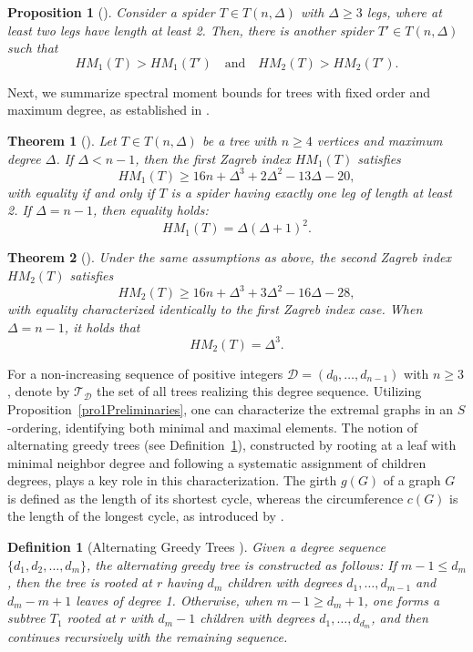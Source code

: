 \documentclass{article}
\newtheorem{theorem}{Theorem}[section]
\newtheorem{proposition}{Proposition}[section]
\newtheorem{definition}{Definition}
\theoremstyle{definition}
\begin{document}
\begin{proposition}[\cite{Dehgardi2025AramHM}]\label{pro0Preliminaries}
Consider a spider $T \in T(n, \Delta)$ with $\Delta \geq 3$ legs, where at least two legs have length at least 2. Then, there is another spider $T' \in T(n, \Delta)$ such that 
$$HM_1(T) > HM_1(T') \quad \text{and} \quad HM_2(T) > HM_2(T').$$
\end{proposition}
Next, we summarize spectral moment bounds for trees with fixed order and maximum degree, as established in \cite{Dehgardi2025AramHM}.

\begin{theorem}[\cite{Dehgardi2025AramHM}]
Let $T \in T(n,\Delta)$ be a tree with $n \geq 4$ vertices and maximum degree $\Delta$. If $\Delta < n-1$, then the first Zagreb index $HM_1(T)$ satisfies
\[
HM_1(T) \geq 16 n + \Delta^3 + 2 \Delta^2 - 13 \Delta - 20,
\]
with equality if and only if $T$ is a spider having exactly one leg of length at least 2. If $\Delta = n-1$, then equality holds:
\[
HM_1(T) = \Delta (\Delta + 1)^2.
\]
\end{theorem}

\begin{theorem}[\cite{Dehgardi2025AramHM}]
Under the same assumptions as above, the second Zagreb index $HM_2(T)$ satisfies
\[
HM_2(T) \geq 16 n + \Delta^3 + 3 \Delta^2 - 16 \Delta - 28,
\]
with equality characterized identically to the first Zagreb index case. When $\Delta = n-1$, it holds that
\[
HM_2(T) = \Delta^3.
\]
\end{theorem}

For a non-increasing sequence of positive integers $\mathscr{D} = (d_0, \ldots, d_{n-1})$ with $n \geq 3$, denote by $\mathcal{T}_{\mathscr{D}}$ the set of all trees realizing this degree sequence. Utilizing Proposition~\ref{pro1Preliminaries}, one can characterize the extremal graphs in an $S$-ordering, identifying both minimal and maximal elements. The notion of alternating greedy trees (see Definition~\ref{defgreedytree}), constructed by rooting at a leaf with minimal neighbor degree and following a systematic assignment of children degrees, plays a key role in this characterization. The girth $g(G)$ of a graph $G$ is defined as the length of its shortest cycle, whereas the circumference $c(G)$ is the length of the longest cycle, as introduced by \cite{HaynesHeSLa13}.

\begin{definition}[Alternating Greedy Trees \cite{Wang2016YuanHS}]\label{defgreedytree}
Given a degree sequence $\{d_1, d_2, \ldots, d_m\}$, the alternating greedy tree is constructed as follows: If $m-1 \leq d_m$, then the tree is rooted at $r$ having $d_m$ children with degrees $d_1, \ldots, d_{m-1}$ and $d_m - m + 1$ leaves of degree 1. Otherwise, when $m-1 \geq d_m + 1$, one forms a subtree $T_1$ rooted at $r$ with $d_m - 1$ children with degrees $d_1, \ldots, d_{d_m}$, and then continues recursively with the remaining sequence.
\end{definition}
\end{document}
